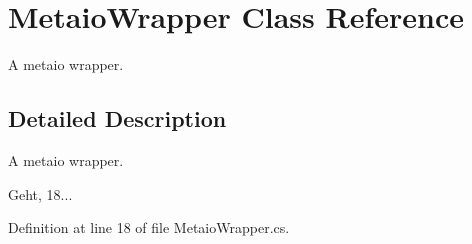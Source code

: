 \section{Metaio\-Wrapper Class Reference}
\label{class_metaio_wrapper}


A metaio wrapper.  




\subsection{Detailed Description}
A metaio wrapper. 

Geht, 18... 

Definition at line 18 of file Metaio\-Wrapper.\-cs.

